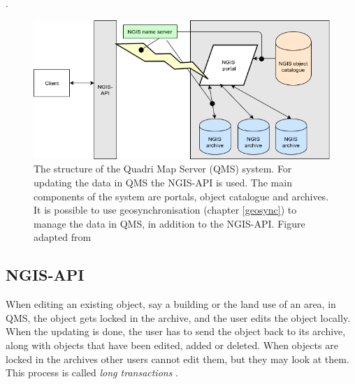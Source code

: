 .

\begin{figure}[H]
	\centering
	\includegraphics[scale=0.5]{img/ngiss.png}
	\caption{The structure of the Quadri Map Server (QMS) system. For updating the data in QMS the NGIS-API is used.  The main components of the system are portals, object catalogue and archives. It is possible to use geosynchronisation (chapter \ref{geosync}) to manage the data in QMS, in addition to the NGIS-API. Figure adapted from \citep{Kartverket2017b} }
	\label{fig:qmsfig}
\end{figure}

\subsection{NGIS-API}\label{qms-api}

When editing an existing object, say a building or the land use of an area, in QMS, the object gets locked in the archive, and the user edits the object locally. When the updating is done, the user has to send the object back to its archive, along with objects that have been edited, added or deleted. When objects are locked in the archives other users cannot edit them, but they may look at them. This process is called \textit{long transactions} \citep{Kartverket2017b}.





